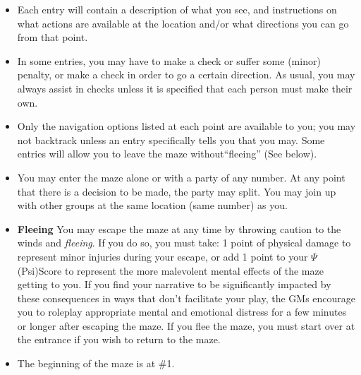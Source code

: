 \documentclass[green]{gl2018}
\begin{document}
\begin{itemize}
\item Each entry will contain a description of what you see, and instructions on what actions are available at the location and/or what directions you can go from that point.  
\item In some entries, you may have to make a check or suffer some (minor) penalty, or make a check in order to go a certain direction. As usual, you may always assist in checks unless it is specified that each person must make their own. 
\item Only the navigation options listed at each point are available to you; you may not backtrack unless an entry specifically tells you that you may. Some entries will allow you to leave the maze without``fleeing'' (See below).
\item You may enter the maze alone or with a party of any number. At any point that there is a decision to be made, the party may split. You may join up with other groups at the same location (same number) as you. 
\item {\bf Fleeing} You may escape the maze at any time by throwing caution to the winds and {\em fleeing}. If you do so, you must take: 1 point of physical damage to represent minor injuries during your escape, or add 1 point to your $\Psi$ (Psi)Score to represent the more malevolent mental effects of the maze getting to you. If you find your narrative to be significantly impacted by these consequences in ways that don't facilitate your play, the GMs encourage you to roleplay appropriate mental and emotional distress for a few minutes or longer after escaping the maze. If you flee the maze, you must start over at the entrance if you wish to return to the maze. 
\item The beginning of the maze is at \#1.
\end{itemize}
\pagebreak
\end{document}
